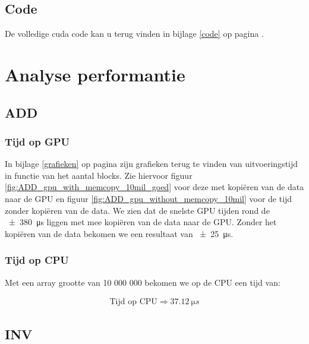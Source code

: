 \documentclass[twoside,a4paper]{article}
\begin{document}
\subsection{Code}
De volledige cuda code kan u terug vinden in bijlage \ref{code} op pagina \pageref{code}.

\section{Analyse performantie}

\subsection{ADD}
\subsubsection{Tijd op GPU}
In bijlage \ref{grafieken} op pagina \pageref{grafieken} zijn grafieken terug te vinden van uitvoeringstijd in functie van het aantal blocks.
Zie hiervoor figuur \ref{fig:ADD_gpu_with_memcopy_10mil_goed} voor deze met kopi\"eren van de data naar de GPU en figuur \ref{fig:ADD_gpu_without_memcopy_10mil} voor de tijd zonder kopi\"eren van de data.
We zien dat de snelste GPU tijden rond de \SI{\pm380}{\micro s} liggen met mee kopi\"eren van de data naar de GPU. Zonder het kopi\"eren van de data bekomen we een resultaat van \SI{\pm25}{\micro s}.


\subsubsection{Tijd op CPU}
Met een array grootte van 10 000 000 bekomen we op de CPU een tijd van:

\begin{align*}
    \text{Tijd op CPU} \Rightarrow \SI{37.12}{\micro s}
\end{align*}


\subsection{INV}
\end{document}
